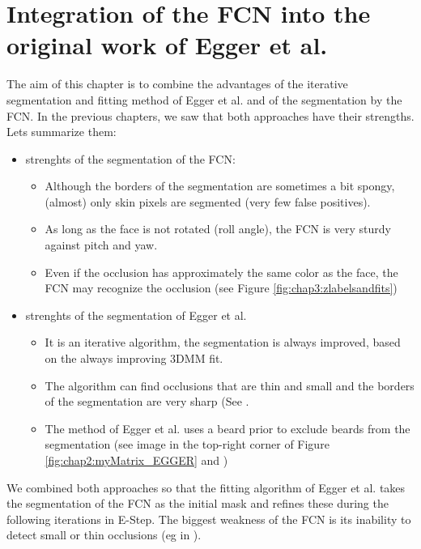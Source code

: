 \chapter{Integration of the FCN into the original work of Egger et al.}

The aim of this chapter is to combine the advantages of the iterative segmentation and fitting method of Egger et al. and of the segmentation by the FCN. In the previous chapters, we saw that both approaches have their strengths. Lets summarize them:

\begin{itemize}
	\item strenghts of the segmentation of the FCN:
	\begin{itemize}
		\item Although the borders of the segmentation are sometimes a bit spongy, (almost) only skin pixels are segmented (very few false positives).
		\item As long as the face is not rotated (roll angle), the FCN is very sturdy against pitch and yaw.
		\item Even if the occlusion has approximately the same color as the face, the FCN may recognize the occlusion (see Figure \ref{fig:chap3:zlabelsandfits})
	\end{itemize}
	\item strenghts of the segmentation of Egger et al.
	\begin{itemize}
		\item It is an iterative algorithm, the segmentation is always improved, based on the always improving 3DMM fit.
		\item The algorithm can find occlusions that are thin and small and the borders of the segmentation are very sharp (See .
		\item The method of Egger et al. uses a beard prior to exclude beards from the segmentation (see image in the top-right corner of Figure \ref{fig:chap2:myMatrix_EGGER} and \cite{egger_paper})
	\end{itemize}
\end{itemize}

We combined both approaches so that the fitting algorithm of Egger et al. takes the segmentation of the FCN as the initial mask and refines these during the following iterations in E-Step. The biggest weakness of the FCN is its inability to detect small or thin occlusions (eg in ). 

